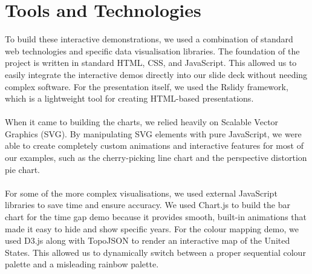 \section{Tools and Technologies}
To build these interactive demonstrations, we used a combination of standard web technologies and specific data visualisation libraries. The foundation of the project is written in standard HTML, CSS, and JavaScript. This allowed us to easily integrate the interactive demos directly into our slide deck without needing complex software. For the presentation itself, we used the Rslidy framework, which is a lightweight tool for creating HTML-based presentations.
\\\\
When it came to building the charts, we relied heavily on Scalable Vector Graphics (SVG). By manipulating SVG elements with pure JavaScript, we were able to create completely custom animations and interactive features for most of our examples, such as the cherry-picking line chart and the perspective distortion pie chart. 
\\\\
For some of the more complex visualisations, we used external JavaScript libraries to save time and ensure accuracy. We used Chart.js to build the bar chart for the time gap demo because it provides smooth, built-in animations that made it easy to hide and show specific years. For the colour mapping demo, we used D3.js along with TopoJSON to render an interactive map of the United States. This allowed us to dynamically switch between a proper sequential colour palette and a misleading rainbow palette.

